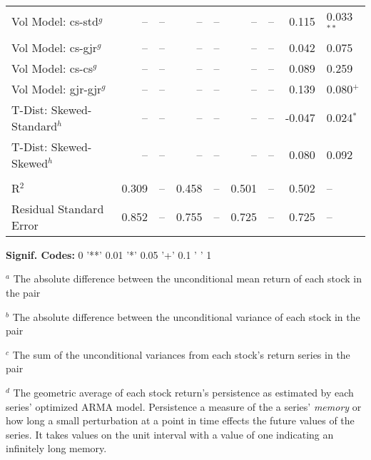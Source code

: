 \begin{table}
\begin{tabular}{l r l r l r l r l}
        Vol Model: cs-std$^{g}$            &     -- & --            &      -- & --           &      -- & --            &   0.115 & 0.033$^{**}$  \\
        Vol Model: cs-gjr$^{g}$            &     -- & --            &      -- & --           &      -- & --            &   0.042 & 0.075         \\
        Vol Model: cs-cs$^{g}$             &     -- & --            &      -- & --           &      -- & --            &   0.089 & 0.259         \\
        Vol Model: gjr-gjr$^{g}$           &     -- & --            &      -- & --           &      -- & --            &   0.139 & 0.080$^{+}$   \\
        T-Dist: Skewed-Standard$^{h}$      &     -- & --            &      -- & --           &      -- & --            &  -0.047 & 0.024$^{*}$   \\
        T-Dist: Skewed-Skewed$^{h}$        &     -- & --            &      -- & --           &      -- & --            &   0.080 & 0.092         \\  \\
        R$^{2}$                            &  0.309 & --            &   0.458 & --           &   0.501 & --            &   0.502 & --            \\
        Residual Standard Error            &  0.852 & --            &   0.755 & --           &   0.725 & --            &   0.725 & --            \\
        \midrule
    \end{tabular}
    \begin{tablenotes}
        \item{\footnotesize \textbf{Signif. Codes:} 0 '**' 0.01 '*' 0.05 '+' 0.1 ' ' 1}
        \item {$^{a}$ The absolute difference between the unconditional mean return of each stock in the pair}
        \item {$^{b}$ The absolute difference between the unconditional variance of each stock in the pair}
        \item {$^{c}$ The sum of the unconditional variances from each stock's return series in the pair}
        \item {$^{d}$ The geometric average of each stock return's persistence as estimated by each series' optimized ARMA model. Persistence a measure of the a series' \textit{memory} or how long a small perturbation at a point in time effects the future values of the series. It takes values on the unit interval with a value of one indicating an infinitely long memory.}

\end{tablenotes}
\end{table}
